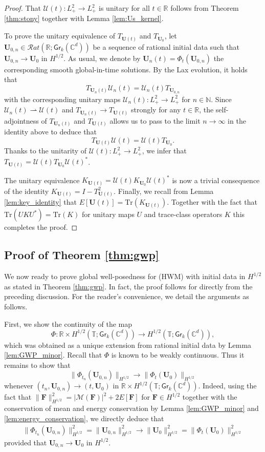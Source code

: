\documentclass[10pt,reqno,a4paper]{amsart}
\theoremstyle{definition}
\theoremstyle{remark}
\theoremstyle{remark}
\numberwithin{equation}{section}
\newcommand{\C}{\mathbb{C}}
\newcommand{\N}{\mathbb{N}}
\newcommand{\R}{\mathbb{R}}
\newcommand{\T}{\mathbb{T}}
\newcommand{\Mean}{\mathscr{M}}
\newcommand{\weakto}{\rightharpoonup}
\newcommand{\Ub}{\mathbf{U}}
\newcommand{\Fb}{\mathbf{F}}
\newcommand{\id}{I}
\newcommand{\Tr}{\mathrm{Tr}}
\newcommand{\Gr}{\mathsf{Gr}}
\newcommand{\Us}{\mathscr{U}}
\begin{document}
\begin{proof}

That $\Us(t) : L^2_+ \to L^2_+$ is unitary for all $t\in \R$ follows from Theorem \ref{thm:stony} together with Lemma \ref{lem:Us_kernel}. 

To prove the unitary equivalence of $T_{\Ub(t)}$ and $T_{\Ub_0}$, let $\Ub_{0,n} \in \mathcal{R}at(\R; \Gr_k(\C^d))$ be a sequence of rational initial data such that $\Ub_{0,n} \to \Ub_0$ in $H^{1/2}$. As usual, we denote by $\Ub_n(t) = \Phi_t(\Ub_{0,n})$ the corresponding smooth global-in-time solutions. By the Lax evolution, it holds that
$$
T_{\Ub_n(t)} \Us_n(t) = \Us_n(t) T_{\Ub_{0,n}}
$$
with the corresponding unitary maps $\Us_n(t) : L^2_+ \to L^2_+$ for $n \in \N$. Since $\Us_n(t) \weakto \Us(t)$ and $T_{\Ub_n(t)} \to T_{\Ub(t)}$ strongly for any $t \in \R$, the self-adjointness of $T_{\Ub_n(t)}$ and $T_{\Ub(t)}$ allows us to pass to the limit $n \to \infty$ in the identity above to deduce that
$$
T_{\Ub(t)} \Us(t) = \Us(t) T_{\Ub_0}.
$$
Thanks to the unitarity of $\Us(t) : L^2_+ \to L^2_+$, we infer that $T_{\Ub(t)} = \Us(t) T_{\Ub_0} \Us(t)^*$.

The unitary equivalence $K_{\Ub(t)} = \Us(t) K_{\Ub_0} \Us(t)^*$ is now a trivial consequence of the identity $K_{\Ub(t)} = \id - T_{\Ub(t)}^2$. Finally, we recall from Lemma \ref{lem:key_identity} that $E[\Ub(t)] = \Tr(K_{\Ub(t)})$. Together with the fact that $\Tr(U K U^*) = \Tr(K)$ for unitary maps $U$ and trace-class operators $K$ this completes the proof. 
\end{proof}

\subsection{Proof of Theorem \ref{thm:gwp}}
We now ready to prove global well-posedness for (HWM) with initial data in $H^{1/2}$ as stated in Theorem \ref{thm:gwp}. In fact, the proof follows for directly from the preceding discussion. For the reader's convenience, we detail the arguments as follows.

First, we show the continuity of the map 
$$
\Phi : \R \times H^{1/2}(\T; \Gr_k(\C^d)) \to H^{1/2}(\T; \Gr_k(\C^d)),
$$ 
which was obtained as a unique extension from rational initial data by Lemma \ref{lem:GWP_minor}. Recall that $\Phi$ is known to be weakly continuous. Thus it remains to show that 
$$
\| \Phi_{t_n}(\Ub_{0,n}) \|_{H^{1/2}} \to \| \Phi_t(\Ub_0) \|_{H^{1/2}}
$$
whenever $(t_n, \Ub_{0,n}) \to (t, \Ub_0)$ in $\R \times H^{1/2}(\T;\Gr_k(\C^d))$. Indeed, using the fact that $\| \Fb \|_{H^{1/2}}^2 = |\Mean(\Fb)|^2 + 2 E[\Fb]$ for $\Fb \in H^{1/2}$ together with the conservation of mean and energy conservation by Lemma \ref{lem:GWP_minor} and \ref{lem:energy_conservation}, we directly deduce that
\begin{align*}
\| \Phi_{t_n}(\Ub_{0,n}) \|_{H^{1/2}}^2 = \| \Ub_{0,n} \|_{H^{1/2}}^2 \to \| \Ub_0 \|_{H^{1/2}}^2 = \| \Phi_t(\Ub_0) \|_{H^{1/2}}^2
\end{align*}
provided that $\Ub_{0,n} \to \Ub_0$ in $H^{1/2}$.
\end{document}
